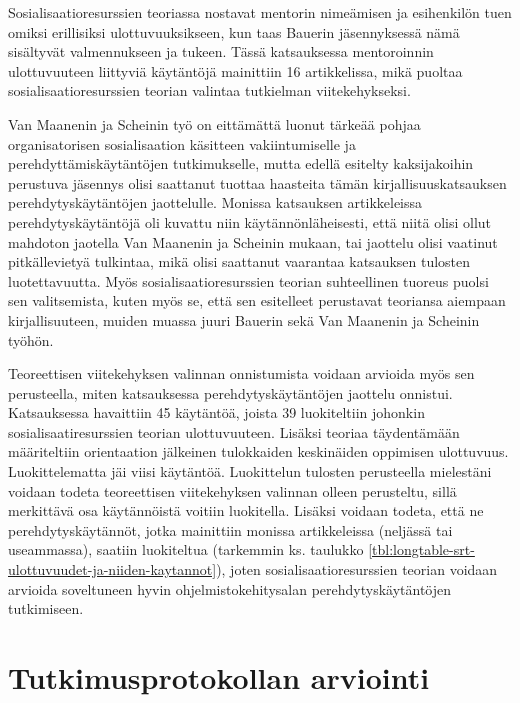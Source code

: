 \documentclass[utf8]{gradu3}
\begin{document}
Sosialisaatioresurssien teoriassa \textcite{saks-gruman-2012} nostavat mentorin nimeämisen ja esihenkilön tuen omiksi erillisiksi ulottuvuuksikseen, kun taas Bauerin jäsennyksessä nämä sisältyvät valmennukseen ja tukeen. Tässä katsauksessa mentoroinnin ulottuvuuteen liittyviä käytäntöjä mainittiin 16 artikkelissa, mikä puoltaa sosialisaatioresurssien teorian valintaa tutkielman viitekehykseksi.

Van Maanenin ja Scheinin työ on eittämättä luonut tärkeää pohjaa organisatorisen sosialisaation käsitteen vakiintumiselle ja perehdyttämiskäytäntöjen tutkimukselle, mutta edellä esitelty kaksijakoihin perustuva jäsennys olisi saattanut tuottaa haasteita tämän kirjallisuuskatsauksen perehdytyskäytäntöjen jaottelulle. Monissa katsauksen artikkeleissa perehdytyskäytäntöjä oli kuvattu niin käytännönläheisesti, että niitä olisi ollut mahdoton jaotella Van Maanenin ja Scheinin mukaan, tai jaottelu olisi vaatinut pitkällevietyä tulkintaa, mikä olisi saattanut vaarantaa katsauksen tulosten luotettavuutta. Myös sosialisaatioresurssien teorian suhteellinen tuoreus puolsi sen valitsemista, kuten myös se, että sen esitelleet \textcite{saks-gruman-2012} perustavat teoriansa aiempaan kirjallisuuteen, muiden muassa juuri Bauerin sekä Van Maanenin ja Scheinin työhön.

Teoreettisen viitekehyksen valinnan onnistumista voidaan arvioida myös sen perusteella, miten katsauksessa perehdytyskäytäntöjen jaottelu onnistui. Katsauksessa havaittiin 45 käytäntöä, joista 39 luokiteltiin johonkin sosialisaatiresurssien teorian \parencite{saks-gruman-2012} ulottuvuuteen. Lisäksi teoriaa täydentämään määriteltiin orientaation jälkeinen tulokkaiden keskinäiden oppimisen ulottuvuus. Luokittelematta jäi viisi käytäntöä. Luokittelun tulosten perusteella mielestäni voidaan todeta teoreettisen viitekehyksen valinnan olleen perusteltu, sillä merkittävä osa käytännöistä voitiin luokitella. Lisäksi voidaan todeta, että ne perehdytyskäytännöt, jotka mainittiin monissa artikkeleissa (neljässä tai useammassa), saatiin luokiteltua (tarkemmin ks. taulukko \ref{tbl:longtable-srt-ulottuvuudet-ja-niiden-kaytannot}), joten sosialisaatioresurssien teorian voidaan arvioida soveltuneen hyvin ohjelmistokehitysalan perehdytyskäytäntöjen tutkimiseen.

\section{Tutkimusprotokollan arviointi}
\label{luku-tutkimusprotokollan-arviointi}
\end{document}
